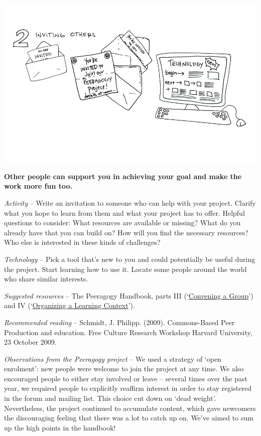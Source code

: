\begin{center}
\includegraphics{../pictures/OpenBook-2-2.jpg}
\end{center}

\textbf{Other people can support you in achieving your goal and make the
work more fun too.}

\emph{Activity} -- Write an invitation to someone who can help with your
project. Clarify what you hope to learn from them and what your project
has to offer. Helpful questions to consider: What resources are
available or missing? What do you already have that you can build on?
How will you find the necessary resources? Who else is interested in
these kinds of challenges?

\emph{Technology} -- Pick a tool that's new to you and could potentially
be useful during the project. Start learning how to use it. Locate some
people around the world who share similar interests.

\emph{Suggested resources} -- The Peeragogy Handbook, parts III
(`\href{http://peeragogy.org/convening-a-group/}{Convening a Group}')
and IV
(`\href{http://peeragogy.org/organizing-a-learning-context/}{Organizing
a Learning Context}').

\emph{Recommended reading} -- Schmidt, J. Philipp. (2009). Commons-Based
Peer Production and education. Free Culture Research Workshop Harvard
University, 23 October 2009.

\emph{Observations from the Peeragogy project} -- We used a strategy of
`open enrolment': new people were welcome to join the project at any
time. We also encouraged people to either stay involved or leave --
several times over the past year, we required people to explicitly
reaffirm interest in order to stay registered in the forum and mailing
list. This choice cut down on `dead weight'. Nevertheless, the project
continued to accumulate content, which gave newcomers the discouraging
feeling that there was a lot to catch up on. We've aimed to sum up the
high points in the handbook!

